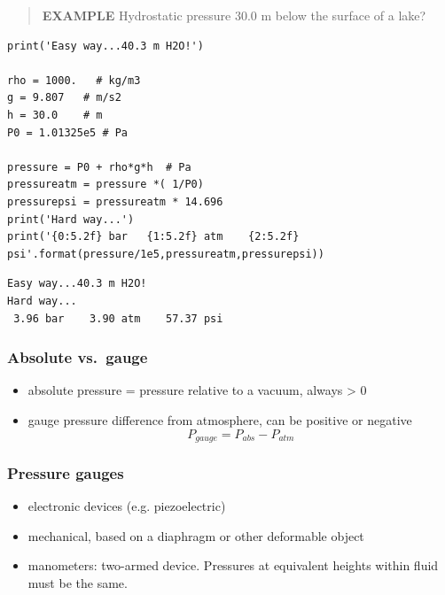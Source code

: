 \documentclass[11pt]{article}
\begin{document}
\begin{quote}
\textbf{EXAMPLE} Hydrostatic pressure 30.0 m below the surface of a lake?
\end{quote}

\begin{verbatim}
print('Easy way...40.3 m H2O!')

rho = 1000.   # kg/m3
g = 9.807   # m/s2
h = 30.0    # m
P0 = 1.01325e5 # Pa

pressure = P0 + rho*g*h  # Pa
pressureatm = pressure *( 1/P0)
pressurepsi = pressureatm * 14.696
print('Hard way...')
print('{0:5.2f} bar   {1:5.2f} atm    {2:5.2f} psi'.format(pressure/1e5,pressureatm,pressurepsi))
\end{verbatim}

\begin{verbatim}
Easy way...40.3 m H2O!
Hard way...
 3.96 bar    3.90 atm    57.37 psi
\end{verbatim}

\subsubsection{Absolute vs.~gauge}
\label{sec-4-6-2}
\begin{itemize}
\item absolute pressure = pressure relative to a vacuum, always > 0
\item gauge pressure difference from atmosphere, can be positive or negative
\[ P_{gauge} = P_{abs} - P_{atm} \]
\end{itemize}
\subsubsection{Pressure gauges}
\label{sec-4-6-3}
\begin{itemize}
\item electronic devices (e.g. piezoelectric)
\item mechanical, based on a diaphragm or other deformable object
\item manometers: two-armed device.  Pressures at equivalent heights within fluid must be the same.
\end{itemize}
\end{document}
